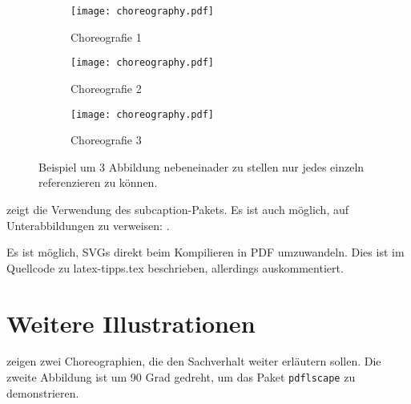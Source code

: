 \begin{figure}
  \hfill
  \begin{subfigure}{.3\textwidth}
    \texttt{[image: choreography.pdf]}
    \caption{Choreografie 1}
    \label{fig:subfigA}
  \end{subfigure}
  \hfill
  \begin{subfigure}{.3\textwidth}
    \texttt{[image: choreography.pdf]}
    \caption{Choreografie 2}
    \label{fig:subfigB}
  \end{subfigure}
  \hfill
  \begin{subfigure}{.3\textwidth}
    \texttt{[image: choreography.pdf]}
    \caption{Choreografie 3}
    \label{fig:subfigC}
  \end{subfigure}
  \caption{Beispiel um 3 Abbildung nebeneinader zu stellen nur jedes einzeln referenzieren zu können.}
  \label{fig:subfig_example}
\end{figure}

 zeigt die Verwendung des subcaption-Pakets.
Es ist auch möglich, auf Unterabbildungen zu verweisen: .

Es ist möglich, SVGs direkt beim Kompilieren in PDF umzuwandeln.
Dies ist im Quellcode zu latex-tipps.tex beschrieben, allerdings auskommentiert.

\iffalse %
  Das SVG in \cref{fig:directSVG} ist direkt eingebunden, während der Text im SVG in \cref{fig:latexSVG} mittels pdflatex gesetzt ist.
  Falls man die Graphiken sehen möchte, muss inkscape im PATH sein und im Tex-Quelltext \texttt{\textbackslash{}iffalse} und \texttt{\textbackslash{}iftrue} auskommentiert sein.

  \begin{figure}
    \centering
    \texttt{[image: svgexample.svg]}
    \caption{SVG direkt eingebunden}
    \label{fig:directSVG}
  \end{figure}

  \begin{figure}
    \centering
    \def\svgwidth{.4\textwidth}
    
    \caption{Text im SVG mittels \LaTeX{} gesetzt}
    \label{fig:latexSVG}
  \end{figure}
\fi %


\section{Weitere Illustrationen}
 zeigen zwei Choreographien, die den Sachverhalt weiter erläutern sollen.
Die zweite Abbildung ist um 90 Grad gedreht, um das Paket \texttt{pdflscape} zu demonstrieren.

